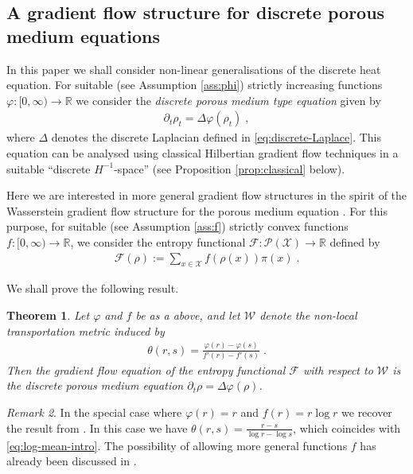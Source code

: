 \documentclass[a4paper,11pt,reqno]{amsart}
\theoremstyle{plain}
\newtheorem{theorem}{Theorem}[section]
\theoremstyle{remark}
\newtheorem{remark}[theorem]{Remark}
\numberwithin{equation}{section}
\begin{document}
\subsection{A gradient flow structure for discrete porous medium equations}
In this paper we shall consider non-linear generalisations of the
discrete heat equation. For suitable (see Assumption \ref{ass:phi})
strictly increasing functions ${\varphi} : [0,\infty) \to {{\mathbb R}}$ we consider
the \emph{discrete porous medium type equation} given by
\begin{align}\label{eq:intro-pm}
  \partial_t \rho_t = \Delta {\varphi}(\rho_t)\;,
\end{align}
where $\Delta$ denotes the discrete Laplacian defined in
\eqref{eq:discrete-Laplace}.  This equation can be analysed using
classical Hilbertian gradient flow techniques in a suitable ``discrete
$H^{-1}$-space'' (see Proposition \ref{prop:classical} below).

Here we are interested in more general gradient flow structures in the
spirit of the Wasserstein gradient flow structure for the porous
medium equation \cite{O01}.  For this purpose, for suitable (see
Assumption \ref{ass:f}) strictly convex functions $f : [0,\infty) \to
{{\mathbb R}}$, we consider the entropy functional ${\mathcal{F}} : {{\mathscr{P}}({\mathcal{X}})} \to {{\mathbb R}}$ defined by
\begin{align}\label{eq:intro-f-entropy}
 {\mathcal{F}}(\rho) := \sum_{x \in {\mathcal{X}}} f(\rho(x)) \pi(x)\;.
\end{align}

We shall prove the following result. 

\begin{theorem}\label{thm:intro-gradient-flow}
  Let ${\varphi}$ and $f$ be as a above, and let ${\mathcal{W}}$ denote the non-local
  transportation metric induced by
  \begin{align}\label{eq:theta-f-phi}
  \theta(r,s) = \frac{{\varphi}(r) - {\varphi}(s)}{f'(r) - f'(s)}\;.
\end{align}
Then the gradient flow equation of the entropy functional ${\mathcal{F}}$ with
respect to ${\mathcal{W}}$ is the discrete porous medium equation $\partial_t
\rho = \Delta {\varphi}(\rho)$.
\end{theorem}

\begin{remark}\label{rem:examples}
  In the special case where ${\varphi}(r) = r$ and $f(r) = r \log r$ we
  recover the result from \cite{CHLZ11,Ma11,Mie11a}. In this case we
  have $\theta(r,s) = \frac{r-s}{\log r - \log s}$, which coincides
  with \eqref{eq:log-mean-intro}.  The possibility of allowing more
  general functions $f$ has already been discussed in \cite{Ma11}.
\end{remark}
\end{document}
